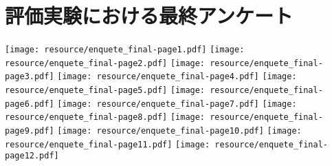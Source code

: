 \section{評価実験における最終アンケート}\label{apdx:finalEnquete}
\texttt{[image: resource/enquete\_final-page1.pdf]}
\newpage
\texttt{[image: resource/enquete\_final-page2.pdf]}
\newpage
\texttt{[image: resource/enquete\_final-page3.pdf]}
\newpage
\texttt{[image: resource/enquete\_final-page4.pdf]}
\newpage
\texttt{[image: resource/enquete\_final-page5.pdf]}
\newpage
\texttt{[image: resource/enquete\_final-page6.pdf]}
\newpage
\texttt{[image: resource/enquete\_final-page7.pdf]}
\newpage
\texttt{[image: resource/enquete\_final-page8.pdf]}
\newpage
\texttt{[image: resource/enquete\_final-page9.pdf]}
\newpage
\texttt{[image: resource/enquete\_final-page10.pdf]}
\newpage
\texttt{[image: resource/enquete\_final-page11.pdf]}
\newpage
\texttt{[image: resource/enquete\_final-page12.pdf]}
\newpage

